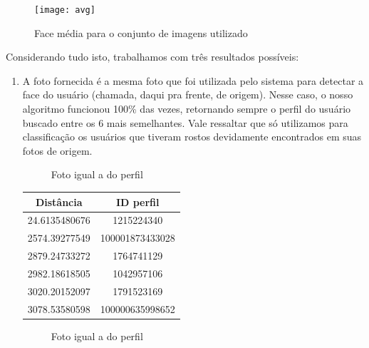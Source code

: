 \documentclass[10pt,a4paper]{article}
\begin{document}
\begin{figure}[h!]
  \begin{center}
    \texttt{[image: avg]}
    \caption{Face média para o conjunto de imagens utilizado}
  \end{center}
\end{figure}

\newpage
	Considerando tudo isto, trabalhamos com três resultados possíveis:

        \begin{enumerate}
	\item A foto fornecida é a mesma foto que foi utilizada pelo sistema para detectar a face do usuário (chamada, daqui pra frente, de origem). Nesse caso, o nosso algoritmo funcionou 100\% das vezes, retornando sempre o perfil do usuário buscado entre os 6 mais semelhantes. Vale ressaltar que só utilizamos para classificação os usuários que tiveram rostos devidamente encontrados em suas fotos de origem.


\begin{flushleft}
\begin{figure}[h!]
\begin{flushleft}
  
\caption{Foto igual a do perfil}
\par\end{flushleft}
\end{figure}
\par\end{flushleft}

\begin{table}[h!]
\begin{center}
\begin{tabular}{cc}
Distância & ID perfil \\
\hline
24.6135480676 & 1215224340\\
2574.39277549 & 100001873433028\\
2879.24733272 & 1764741129\\
2982.18618505 & 1042957106\\
3020.20152097 & 1791523169\\
3078.53580598 & 100000635998652
\end{tabular}
\end{center}
\end{table}



\begin{flushleft}
\begin{figure}[h!]
\begin{flushleft}
  
\caption{Foto igual a do perfil}
\par\end{flushleft}
\end{figure}
\par\end{flushleft}


\end{enumerate}
\end{document}
